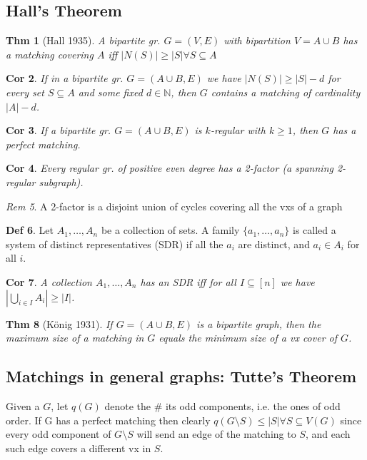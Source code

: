 \documentclass[11pt, fleqn, a4paper, landscape]{article}
\theoremstyle{plain} %
\newtheorem{thm}{Thm}
\newtheorem{cor}[thm]{Cor}
\theoremstyle{remark} %
\newtheorem{rem}[thm]{Rem}
\theoremstyle{definition} %
\newtheorem{defi}[thm]{Def}
\begin{document}
\begin{multicols}{5}
\subsection{Hall’s Theorem}
\begin{thm}[Hall 1935]
A bipartite gr. $G = (V,E)$ with bipartition $V = A\cup B$ has a matching
covering $A$ iff $|N(S)|\ge|S|\forall S \subseteq A$
\end{thm}

\begin{cor}
 If in a bipartite gr. $G = (A\cup B,E)$ we have $|N(S)|\ge|S|-d$ for every set $S \subseteq A$ and some fixed $d\in\mathbb{N}$, then $G$ contains a matching of cardinality $|A|- d$.
\end{cor}

\begin{cor}
If a bipartite gr. $G = (A \cup B,E) $ is $k$-regular with $k \ge 1$, then $G$ has a perfect matching.
\end{cor}

\begin{cor}
Every regular gr. of positive even degree has a 2-factor (a spanning 2-regular subgraph).
\end{cor}

\begin{rem}
A 2-factor is a disjoint union of cycles covering all the vxs of a graph
\end{rem}

\begin{defi}
Let $A_1, \dots ,A_n$ be a collection of sets. A family $\{a_1, \dots , a_n\}$  is called a system of distinct representatives (SDR) if all the $a_i$ are distinct, and $a_i \in A_i$ for all $i$.
\end{defi}

\begin{cor}
A collection $A_1, \dots ,A_n$ has an SDR iff for all $I \subseteq [n]$ we have $|\bigcup_{i\in I} A_i|\ge|I|$.
\end{cor}
\addtocounter{thm}{1}
\begin{thm}[König 1931]
If $G = (A \cup B,E)$ is a bipartite graph, then the maximum size of a
matching in $G$ equals the minimum size of a vx cover of $G$.
\end{thm}

\subsection{Matchings in general graphs: Tutte’s Theorem}
Given a $G$, let $q(G)$ denote the \# its odd components, i.e. the ones of odd order. If G has a perfect matching then clearly
$q(G\setminus S) \le|S| \forall S \subseteq V (G)$
since every odd component of $G\setminus S$ will send an edge of the matching to $S$, and each such edge covers a different vx in $S$.


\end{multicols}
\end{document}
